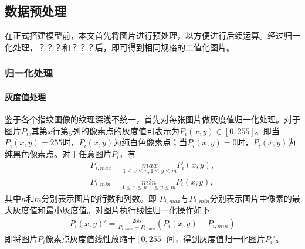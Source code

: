 \documentclass{whutmod}
\begin{document}
		\subsection{数据预处理}
		在正式搭建模型前，本文首先将图片进行预处理，以方便进行后续运算。经过归一化处理，？？？和？？？后，即可得到相同规格的二值化图片。
		\subsubsection{归一化处理}
		\paragraph{灰度值处理}
		鉴于各个指纹图像的纹理深浅不统一，首先对每张图片做灰度值归一化处理。对于图片$P_{i}$,其第$x$行第$y$列的像素点的灰度值可表示为$P_{i}(x,y)\in[0,255]$。即当$P_{i}(x,y)=255$时，$P_{i}(x,y)$为纯白色像素点；当$P_{i}(x,y)=0$时，$P_{i}(x,y)$为纯黑色像素点。对于任意图片$P_{i}$，有
		\begin{gather*}
		P_{i,max}=\underset{1\leqslant x\leqslant n,1\leqslant y \leqslant  m}{max}P_{i}(x,y),\\
		P_{i,min}=\underset{1\leqslant x\leqslant n,1\leqslant y \leqslant  m}{min}P_{i}(x,y),
		\end{gather*}
		其中$n$和$m$分别表示图片的行数和列数。即	$P_{i,max}$与$P_{i,min}$分别表示图片中像素的最大灰度值和最小灰度值。对图片执行线性归一化操作如下
		\begin{gather*}
     	P_i(x,y)'=\frac{255}{P_{i,max}-P_{i,min}}(P_i(x,y)-P_{i,min})
		\end{gather*}
		即将图片$P_i$像素点灰度值线性放缩于$[0,255]$间，得到灰度值归一化图片$P_i'$。
	    
\end{document}
